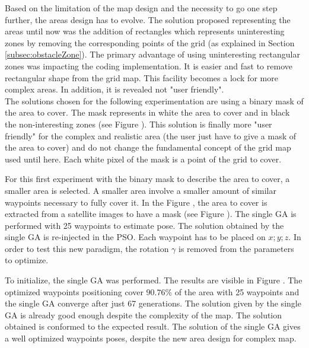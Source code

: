 Based on the limitation of the map design and the necessity to go one step further, the areas design has to evolve.
The solution proposed representing the areas until now was the addition of rectangles which represents uninteresting zones by removing the corresponding points of the grid (as explained in Section \ref{subsec:obstacleZone}). The primary advantage of using uninteresting  rectangular zones was impacting the coding implementation. It is easier and fast to remove rectangular shape from the grid map. 
This facility becomes a lock for more complex areas. In addition, it is revealed not "user friendly".\\
 The solutions chosen for the following experimentation are using a binary mask of the area to cover. The mask represents in white the area to cover and in black the non-interesting zones (see Figure  ). This solution is finally more "user friendly" for the complex and realistic area (the user just have to give a mask of the area to cover) and do not change the fundamental concept of the grid map used until here. Each white pixel of the mask is a point of the grid to cover.  
  

For this first experiment with the binary mask to describe the area to cover, a smaller area is selected. A smaller area involve a smaller amount of similar waypoints necessary to fully cover it. In the Figure , the area to cover is extracted from a satellite images to have a mask (see Figure ). The single GA is performed  with 25 waypoints to estimate pose. The solution obtained by the single GA is re-injected in the PSO. Each waypoint has to be placed on $x; y; z$. In order to test this new paradigm, the rotation $\gamma$ is removed from the parameters to optimize.

 To initialize, the single GA was performed. The results are visible in Figure . The optimized waypoints positioning cover $90.76\%$ of the area with 25 waypoints and the single GA converge after just 67 generations. The solution given by the single GA is already good enough despite the complexity of the map. 
  The solution obtained is conformed to the expected result. The solution of the single GA gives a well optimized waypoints poses, despite the new area design for complex map. 
  
